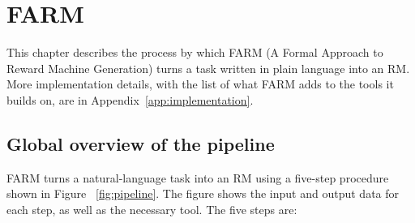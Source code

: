 \documentclass[11pt,english,listoffigures,listoftables]{tfgetsinf}
\begin{document}

\chapter{FARM}
\label{chap:farm}
This chapter describes the process by which FARM (A Formal Approach to Reward Machine Generation) turns a task written in plain language into an RM. More implementation details, with the list of what FARM adds to the tools it builds on, are in Appendix~\ref{app:implementation}.

\section{Global overview of the pipeline}
\label{sec:overview}
FARM turns a natural-language task into an RM using a five-step procedure shown in Figure ~\ref{fig:pipeline}. The figure shows the input and output data for each step, as well as the necessary tool. The five steps are:
\end{document}
